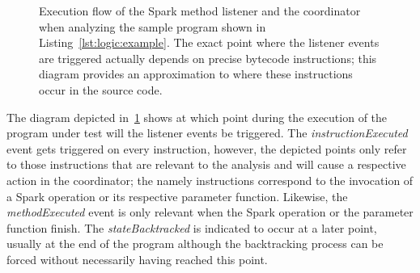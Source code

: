 \begin{figure}[t]
	\caption[Execution flow of the Spark Method Listener and Coordinator]{Execution flow of the Spark method listener and the coordinator when analyzing the sample program shown in Listing~\ref{lst:logic:example}. The exact point where the listener events are triggered actually depends on precise bytecode instructions; this diagram provides an approximation to where these instructions occur in the source code.}
	\label{fig:listener:flow-diagram}
\end{figure}

The diagram depicted in~\ref{fig:listener:flow-diagram} shows at which point during the execution of the program under test will the listener events be triggered. The \textit{instructionExecuted} event gets triggered on every instruction, however, the depicted points only refer to those instructions that are relevant to the analysis and will cause a respective action in the coordinator; the namely instructions correspond to the invocation of a Spark operation or its respective parameter function. Likewise, the \textit{methodExecuted} event is only relevant when the Spark operation or the parameter function finish. The \textit{stateBacktracked} is indicated to occur at a later point, usually at the end of the program although the backtracking process can be forced without necessarily having reached this point.
